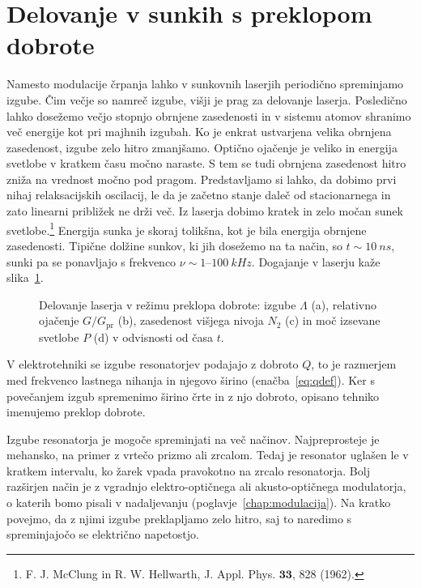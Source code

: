\section{Delovanje v sunkih s preklopom dobrote}
\label{qswitch}
Namesto modulacije črpanja lahko v sunkovnih laserjih periodično spreminjamo 
izgube. Čim večje so namreč izgube, višji 
je prag za delovanje laserja. 
Posledično lahko dosežemo večjo stopnjo obrnjene zasedenosti in v sistemu atomov shranimo več 
energije kot pri majhnih izgubah.
Ko je enkrat ustvarjena velika obrnjena zasedenost, izgube zelo hitro zmanjšamo. 
Optično ojačenje je veliko in energija svetlobe v kratkem času močno naraste. 
S tem se tudi obrnjena zasedenost hitro zniža na vrednost močno pod pragom.
Predstavljamo si lahko, da dobimo prvi nihaj relaksacijskih oscilacij, le da
je začetno stanje daleč od stacionarnega in zato linearni približek ne drži več.
Iz laserja dobimo kratek in zelo močan sunek svetlobe.\footnote{F. J.
McClung in R. W. Hellwarth, J. Appl. Phys. $\mathbf{33}$, 828 (1962).} Energija
sunka je skoraj tolikšna, kot je bila energija obrnjene zasedenosti. 
Tipične dolžine sunkov, ki jih dosežemo na ta način, so $t \sim 10~\si{ns}$, sunki
pa se ponavljajo s frekvenco $\nu \sim 1$--$100~\si{kHz}$.
Dogajanje v laserju kaže slika~\ref{fig:pulseQ}.
\begin{figure}[ht]
\centering
\def\svgwidth{95truemm} 

\caption{Delovanje laserja v režimu preklopa dobrote: izgube $\Lambda$ (a), relativno 
ojačenje $G/G_\mathrm{pr}$ (b), 
zasedenost višjega nivoja $N_2$ (c) in moč izsevane svetlobe $P$ (d) v odvisnosti od časa $t$.}
\label{fig:pulseQ}
\end{figure}
\begin{remark}
V elektrotehniki se izgube resonatorjev podajajo z dobroto $Q$, to je razmerjem
med frekvenco lastnega nihanja in njegovo širino (enačba~\ref{eq:qdef}). 
Ker s povečanjem izgub spremenimo 
širino črte in z njo dobroto, opisano tehniko imenujemo preklop 
dobrote.
\end{remark}
Izgube resonatorja je mogoče spreminjati na več načinov. Najpreprosteje
je mehansko, na primer z vrtečo prizmo ali zrcalom. Tedaj je resonator uglašen le v kratkem
intervalu, ko žarek vpada pravokotno na zrcalo resonatorja. Bolj razširjen način 
je z vgradnjo elektro-optičnega ali akusto-optičnega modulatorja, o katerih
bomo pisali v nadaljevanju (poglavje~\ref{chap:modulacija}). Na kratko povejmo, 
da z njimi izgube preklapljamo zelo hitro, saj to naredimo s spreminjajočo se 
električno napetostjo.

